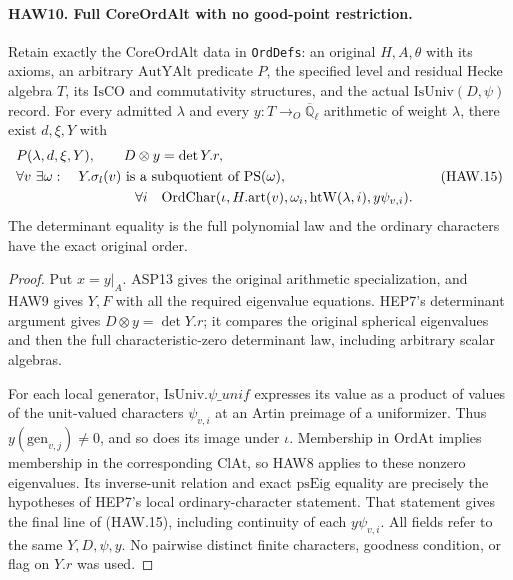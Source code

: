 \paragraph{HAW10. Full CoreOrdAlt with no good-point restriction.}
\label{claim:HAW10}
Retain exactly the $\mathrm{CoreOrdAlt}$ data in
\texttt{OrdDefs}: an original $H,A,\theta$ with its axioms,
an arbitrary $\mathrm{AutYAlt}$ predicate $P$, the specified
level and residual Hecke algebra $T$, its $\mathrm{IsCO}$
and commutativity structures, and the actual
$\mathrm{IsUniv}(D,\psi)$ record.  For every admitted
$\lambda$ and every $y:T\to_O\overline{\mathbb Q}_\ell$
arithmetic of weight $\lambda$, there exist $d,\xi,Y$ with
\[
 \begin{split}
 &P(\lambda,d,\xi,Y),\qquad D\otimes y=\det Y.r,\\
 &\forall v\ \exists\omega:\quad
 Y.\sigma_l(v)\text{ is a subquotient of }\mathrm{PS}(\omega),\\
 &\hspace{30mm}\forall i\quad
 \mathrm{OrdChar}(\iota,H.\mathrm{art}(v),\omega_i,
                       \mathrm{htW}(\lambda,i),y\psi_{v,i}).
 \end{split}
 \tag{HAW.15}
\]
The determinant equality is the full polynomial law and the
ordinary characters have the exact original order.
\begin{proof}
Put $x=y|_A$.  ASP13 gives the original arithmetic
specialization, and HAW9 gives $Y,F$ with all the required
eigenvalue equations.  HEP7's determinant argument gives
$D\otimes y=\det Y.r$; it compares the original spherical
eigenvalues and then the full characteristic-zero determinant
law, including arbitrary scalar algebras.

For each local generator, $\mathrm{IsUniv}.\psi\_unif$
expresses its value as a product of values of the unit-valued
characters $\psi_{v,i}$ at an Artin preimage of a uniformizer.
Thus $y(\mathrm{gen}_{v,j})\ne0$, and so does its image
under $\iota$.  Membership in $\mathrm{OrdAt}$ implies
membership in the corresponding $\mathrm{ClAt}$, so HAW8
applies to these nonzero eigenvalues.  Its inverse-unit
relation and exact $\mathrm{psEig}$ equality are precisely
the hypotheses of HEP7's local ordinary-character statement.
That statement gives the final line of (HAW.15), including
continuity of each $y\psi_{v,i}$.  All fields refer to the
same $Y,D,\psi,y$.  No pairwise distinct finite characters,
goodness condition, or flag on $Y.r$ was used.
\end{proof}

